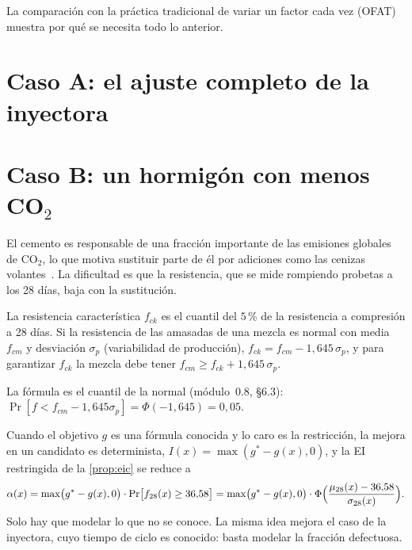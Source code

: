 \addtocounter{figure}{1}%

La comparación con la práctica tradicional de variar un factor cada vez (OFAT) muestra por qué se necesita todo lo anterior.

\addtocounter{definicion}{1}%

\section{Caso A: el ajuste completo de la inyectora}

\addtocounter{definicion}{1}%

\section{Caso B: un hormigón con menos CO\texorpdfstring{$_2$}{2}}

El cemento es responsable de una fracción importante de las emisiones globales de CO$_2$, lo que motiva sustituir parte de él por adiciones como las cenizas volantes~\cite{ament}. La dificultad es que la resistencia, que se mide rompiendo probetas a los 28 días, baja con la sustitución.

\begin{definicion}\label{def:fck}
La resistencia característica $f_{ck}$ es el cuantil del $5\,\%$ de la resistencia a compresión a 28 días. Si la resistencia de las amasadas de una mezcla es normal con media $f_{cm}$ y desviación $\sigma_p$ (variabilidad de producción), $f_{ck}=f_{cm}-1{,}645\,\sigma_p$, y para garantizar $f_{ck}$ la mezcla debe tener $f_{cm}\ge f_{ck}+1{,}645\,\sigma_p$.
\end{definicion}

La fórmula es el cuantil de la normal (módulo~0.8, §6.3): $\Pr[f<f_{cm}-1{,}645\sigma_p]=\Phi(-1{,}645)=0{,}05$.

\addtocounter{definicion}{1}%

\begin{observacion}\label{obs:objconocido}
Cuando el objetivo $g$ es una fórmula conocida y lo caro es la restricción, la mejora en un candidato es determinista, $I(x)=\max(g^*-g(x),0)$, y la EI restringida de la \cref{prop:eic} se reduce a
\[
\alpha(x)=\max\bigl(g^*-g(x),0\bigr)\cdot\Pr\bigl[f_{28}(x)\ge 36{,}58\bigr]=\max\bigl(g^*-g(x),0\bigr)\cdot\Phi\Bigl(\frac{\mu_{28}(x)-36{,}58}{\sigma_{28}(x)}\Bigr).
\]
Solo hay que modelar lo que no se conoce. La misma idea mejora el caso de la inyectora, cuyo tiempo de ciclo es conocido: basta modelar la fracción defectuosa.
\end{observacion}

